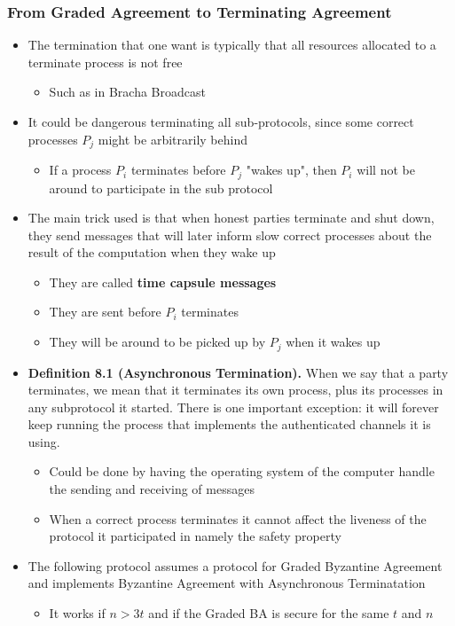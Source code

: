 \documentclass[11pt]{article}
\begin{document}
\subsubsection{From Graded Agreement to Terminating Agreement}
\label{sec:org63f802e}
\begin{itemize}
\item The termination that one want is typically that all resources allocated to a terminate process is not free
\begin{itemize}
\item Such as in Bracha Broadcast
\end{itemize}

\item It could be dangerous terminating all sub-protocols, since some correct processes \(P_j\) might be arbitrarily behind
\begin{itemize}
\item If a process \(P_i\) terminates before \(P_j\) "wakes up", then \(P_i\) will not be around to participate in the sub protocol
\end{itemize}

\item The main trick used is that when honest parties terminate and shut down, they send messages that will later inform slow correct processes about the result of the computation when they wake up
\begin{itemize}
\item They are called \textbf{time capsule messages}
\item They are sent before \(P_i\) terminates
\item They will be around to be picked up by \(P_j\) when it wakes up
\end{itemize}

\item \textbf{Definition 8.1 (Asynchronous Termination).} When we say that a party terminates, we mean that it terminates its own process, plus its processes in any subprotocol it started. There is one important exception: it will forever keep running the process that implements the authenticated channels it is using.
\begin{itemize}
\item Could be done by having the operating system of the computer handle the sending and receiving of messages
\item When a correct process terminates it cannot affect the liveness of the protocol it participated in namely the safety property
\end{itemize}

\item The following protocol assumes a protocol for Graded Byzantine Agreement and implements Byzantine Agreement with Asynchronous Terminatation
\begin{itemize}
\item It works if \(n>3t\) and if the Graded BA is secure for the same \(t\) and \(n\)
\end{itemize}
\end{itemize}
\end{document}
